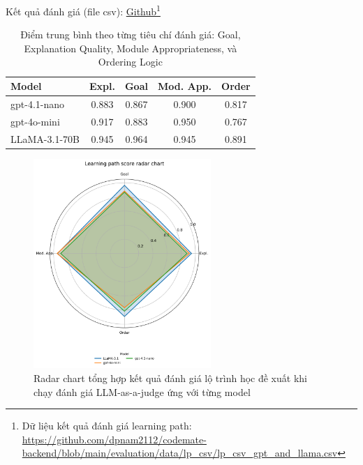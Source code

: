 Kết quả đánh giá (file csv): \href{https://github.com/dpnam2112/codemate-backend/blob/main/evaluation/data/lp_csv/lp_csv_gpt_and_llama.csv}{Github}\footnote{Dữ liệu kết quả đánh giá learning path: \url{https://github.com/dpnam2112/codemate-backend/blob/main/evaluation/data/lp_csv/lp_csv_gpt_and_llama.csv}}

\begin{table}[h!]
\centering
\begin{tabular}{lcccc}
\toprule
\textbf{Model} & \textbf{Expl.} & \textbf{Goal} & \textbf{Mod. App.} & \textbf{Order} \\
\midrule
gpt-4.1-nano & 0.883 & 0.867 & 0.900 & 0.817 \\
gpt-4o-mini  & 0.917 & 0.883 & 0.950 & 0.767 \\
LLaMA-3.1-70B & 0.945 & 0.964 & 0.945 & 0.891 \\
\bottomrule
\end{tabular}
\caption{Điểm trung bình theo từng tiêu chí đánh giá: Goal, Explanation Quality, Module Appropriateness, và Ordering Logic}
\label{tab:avg_scores_abbr}
\end{table}

\begin{figure}[H]
\centering
    \includegraphics[width=0.6\textwidth]{images/lp_eval_radar_chart.png}
    \caption{Radar chart tổng hợp kết quả đánh giá lộ trình học đề xuất khi chạy đánh giá LLM-as-a-judge ứng với từng model}
\end{figure}

